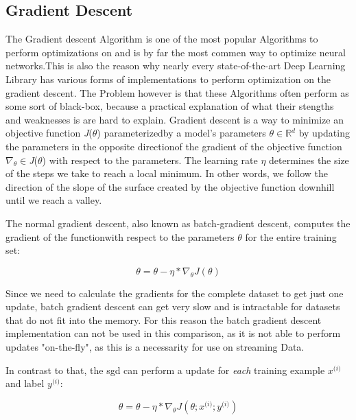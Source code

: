 \documentclass[12pt,oneside,a4paper,parskip]{scrbook}
\newcommand{\R}{\mathbb{R}}
\begin{document}
\subsection{Gradient Descent}
The Gradient descent Algorithm is one of the most popular Algorithms to perform optimizations on and is by far the most 
commen way to optimize neural networks.This is also the reason why nearly every state-of-the-art Deep Learning Library 
has various forms of implementations to perform optimization on the gradient descent. The Problem however is that these
Algorithms often perform as some sort of black-box, because a practical explanation of what their stengths and weaknesses 
is are hard to explain.
Gradient descent is a way to minimize an objective function \textit{J}($\theta$) parameterizedby a model's parameters $\theta \in \R{}^d$ by 
updating the parameters in the opposite directionof the gradient of the objective function $\nabla_\theta \in $\textit{J}($\theta$) with respect to 
the parameters. The learning rate $\eta$ determines the size of the steps we take to reach a local minimum. In other words, 
we follow the direction of the slope of the surface created by the objective function downhill until we reach a valley. \cite{overvieDiffRSLVQ}

The normal gradient descent, also known as batch-gradient descent, computes the gradient of the functionwith 
respect to the parameters $\theta$ for the entire training set:

\begin{equation}
\theta = \theta - \eta * \nabla_\theta \textit{J}(\theta)
\end{equation}

Since we need to calculate the gradients for the complete dataset to get just one update, batch gradient descent can get very
slow and is intractable for datasets that do not fit into the memory. For this reason the batch gradient descent implementation
can not be used in this comparison, as it is not able to perform updates "on-the-fly", as this is a necessarity for use on streaming Data. 

In contrast to that, the \ac{sgd} can perform a update for \textit{each} training example
$\textit{x}^\textit{(i)}$ and label $\textit{y}^\textit{(i)}$:

\begin{equation}
\theta = \theta - \eta * \nabla_\theta \textit{J}(\theta;\textit{x}^\textit{(i)};\textit{y}^\textit{(i)})
\end{equation}
\end{document}
